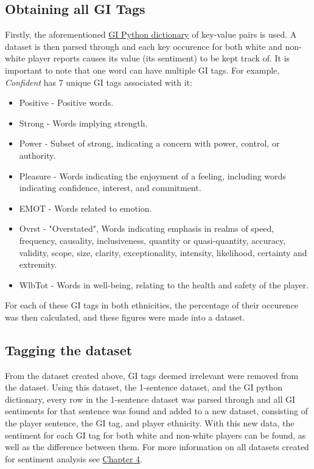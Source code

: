 \documentclass[oneside,12pt]{Classes/RoboticsLaTeX}
\begin{document}
\subsection{Obtaining all GI Tags}
Firstly, the aforementioned \hyperref[sec:GI_dict]{GI Python dictionary} of key-value pairs is used. A dataset is then parsed through and each key occurence for both white and non-white player reports
causes its value (its sentiment) to be kept track of. It is important to note that one word can have multiple GI tags. For example, {\it Confident} has 7 unique GI tags associated with it:
\begin{itemize}
  \item Positive - Positive words.
  \item Strong - Words implying strength.
  \item Power - Subset of strong, indicating a concern with power, control, or authority.
  \item Pleasure - Words indicating the enjoyment of a feeling, including words indicating confidence, interest, and commitment.
  \item EMOT - Words related to emotion.
  \item Ovrst - "Overstated", Words indicating emphasis in realms of speed, frequency, causality, inclusiveness, quantity or 
                  quasi-quantity, accuracy, validity, scope, size, clarity, exceptionality, intensity, likelihood, certainty and extremity.
  \item WlbTot - Words in well-being, relating to the health and safety of the player.
\end{itemize}
For each of these GI tags in both ethnicities, the percentage of their occurence was then calculated, and these figures were made into a dataset.
\subsection{Tagging the dataset}
From the dataset created above, GI tags deemed irrelevant were removed from the dataset. Using this dataset, the 1-sentence dataset, and the GI python dictionary, every row in the 1-sentence dataset was parsed through and all GI 
sentiments for that sentence was found and added to a new dataset, consisting of the player sentence, the GI tag, and player ethnicity. With this new data, the sentiment for each GI tag for both white and non-white players can be found,
as well as the difference between them. For more information on all datasets created for sentiment analysis see \hyperref[sec:senti_data]{Chapter 4}.
\end{document}

